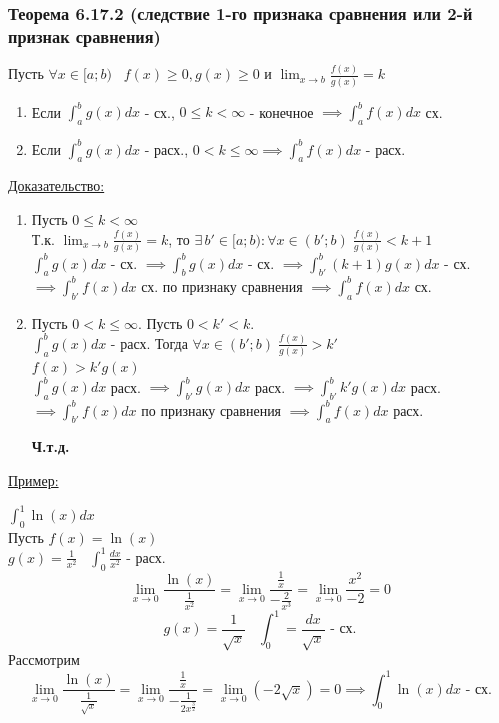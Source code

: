 \documentclass[12pt]{article}
\begin{document}
    \subsubsection*{Теорема 6.17.2 (следствие 1-го признака сравнения или 2-й признак сравнения)}\label{th:}
    Пусть $\forall x \in [a;b) \;\;\; f(x)\geq 0,g(x)\geq 0$ и $\lim_{x \to b}\frac{f(x)}{g(x)}=k$
    \begin{enumerate}
        \item Если $\int_{a}^{b}g(x)dx$ - сх., $0\leq k< \infty$ - конечное $\implies \int_{a}^{b}f(x)dx$ сх.
        \item Если $\int_{a}^{b}g(x)dx$ - расх., $0 < k \leq \infty \implies \int_{a}^{b}f(x)dx$ - расх.
    \end{enumerate}
    \underline{Доказательство:}
    \begin{adjustwidth}{1.5em}{1.5em}
        \begin{enumerate}
            \item Пусть $0\leq k < \infty$\\
            Т.к. $\lim_{x \to b} \frac{f(x)}{g(x)} = k$, то $\exists\,b' \in [a;b):\forall x\in (b';b) \; \frac{f(x)}{g(x)}<{k+1}$\\
            $\int_{a}^{b}g(x)dx$ - сх. $\implies \int_{b}^{b}g(x)dx$ - сх. $\implies \int_{b'}^{b}(k+1)g(x)dx$ - сх. $\implies \int_{b'}^{b}f(x)dx$ сх. по признаку сравнения $\implies \int_{a}^{b}f(x)dx$ сх.
            \item Пусть $0<k\leq \infty$. Пусть $0<k'<k$.\\
            $\int_{a}^{b}g(x)dx$ - расх. Тогда $\forall x \in (b';b) \; \frac{f(x)}{g(x)}>k'$\\
            $f(x)>k'g(x)$\\
            $\int_{a}^{b}g(x)dx$ расх. $\implies \int_{b'}^{b} g(x)dx$ расх. $\implies \int_{b'}^{b} k'g(x)dx$ расх. $\implies \int_{b'}^{b}f(x)dx$ по признаку
            сравнения $\implies \int_{a}^{b}f(x)dx$ расх. 
            \begin{center}
                \textbf{Ч.т.д.}
            \end{center}
        \end{enumerate}
    \end{adjustwidth}
    \underline{Пример:}
    \begin{adjustwidth}{1.5em}{1.5em}
        $\int_{0}^{1} \ln(x)dx$\\
        Пусть $f(x)=\ln(x)$\\
        $g(x)=\frac{1}{x^2} \;\;\; \int_{0}^{1}\frac{dx}{x^2}$ - расх.\\
        \[ \lim_{x \to 0}\frac{\ln(x)}{\frac{1}{x^2}}=\lim_{x \to 0}\frac{\frac{1}{x}}{-\frac{2}{x^3}}=\lim_{x \to 0}\frac{x^2}{-2}=0 \]
        \[ g(x)=\frac{1}{\sqrt{x}} \;\;\; \int_{0}^{1}=\frac{dx}{\sqrt{x}} \text{ - сх.}\]
        Рассмотрим 
        \[ \lim_{x \to 0}\frac{\ln(x)}{\frac{1}{\sqrt{x}}}=\lim_{x \to 0}\frac{\frac{1}{x}}{-\frac{1}{2x^{\frac{3}{2}}}}=\lim_{x \to 0}(-2\sqrt{x})=0 \implies \int_{0}^{1}\ln(x)dx \text{ - сх.}\]
    \end{adjustwidth}
\end{document}
